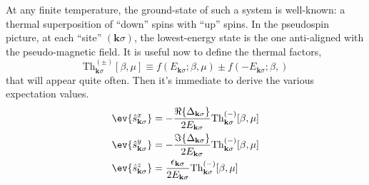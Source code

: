 At any finite temperature, the ground-state of such a system is well-known: a thermal superposition of ``down'' spins with ``up'' spins. In the pseudospin picture, at each ``site'' $(\mathbf{k}\sigma)$, the lowest-energy state is the one anti-aligned with the pseudo-magnetic field. It is useful now to define the thermal factors,
\begin{equation}\label{appeq:af-thermal-factors-def}
	\mathrm{Th}_{\mathbf{k}\sigma}^{(\pm)}[\beta,\mu] \equiv 
	f\left(
		E_{\mathbf{k}\sigma};\beta,\mu
	\right) \pm f\left(
		-E_{\mathbf{k}\sigma};\beta,
	\right)
\end{equation}
that will appear quite often. Then it's immediate to derive the various expectation values.
\begin{align}
	\ev{\hat s_{\mathbf{k}\sigma}^x} &= -\frac{\Re\lbrace\Delta_{\mathbf{k}\sigma}\rbrace}{2E_{\mathbf{k}\sigma}} \mathrm{Th}_{\mathbf{k}\sigma}^{(-)}[\beta,\mu] \label{appeq:hm-af-sx}\\
	\ev{\hat s_{\mathbf{k}\sigma}^y} &= -\frac{\Im\lbrace\Delta_{\mathbf{k}\sigma}\rbrace}{2E_{\mathbf{k}\sigma}}  \mathrm{Th}_{\mathbf{k}\sigma}^{(-)}[\beta,\mu] \label{appeq:hm-af-sy}\\
	\ev{\hat s_{\mathbf{k}\sigma}^z} &=  \frac{\epsilon_{\mathbf{k}\sigma}}{2E_{\mathbf{k}\sigma}}  \mathrm{Th}_{\mathbf{k}\sigma}^{(-)}[\beta,\mu] \label{appeq:hm-af-sz}
\end{align}

